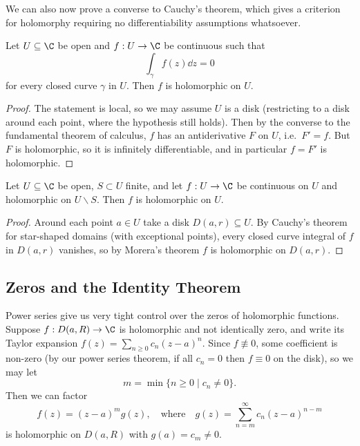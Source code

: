 We can also now prove a converse to Cauchy's theorem, which gives a criterion for holomorphy requiring no differentiability assumptions whatsoever.

\begin{theorem}
    Let $U \subseteq \C$ be open and $f: U \rightarrow \C$ be continuous such that
    $$
    \int_\gamma f(z) \dd z = 0
    $$
    for every closed curve $\gamma$ in $U$. Then $f$ is holomorphic on $U$.
\end{theorem}
\begin{proof}
    The statement is local, so we may assume $U$ is a disk (restricting to a disk around each point, where the hypothesis still holds). Then by the converse to the fundamental theorem of calculus, $f$ has an antiderivative $F$ on $U$, i.e.\ $F' = f$. But $F$ is holomorphic, so it is infinitely differentiable, and in particular $f = F'$ is holomorphic.
\end{proof}

\begin{corollary}
    Let $U \subseteq \C$ be open, $S \subset U$ finite, and let $f: U \rightarrow \C$ be continuous on $U$ and holomorphic on $U \backslash S$. Then $f$ is holomorphic on $U$.
\end{corollary}
\begin{proof}
    Around each point $a \in U$ take a disk $D(a, r) \subseteq U$. By Cauchy's theorem for star-shaped domains (with exceptional points), every closed curve integral of $f$ in $D(a, r)$ vanishes, so by Morera's theorem $f$ is holomorphic on $D(a, r)$.
\end{proof}

\subsection{Zeros and the Identity Theorem}

Power series give us very tight control over the zeros of holomorphic functions. Suppose $f: D(a, R) \rightarrow \C$ is holomorphic and not identically zero, and write its Taylor expansion $f(z) = \sum_{n \geq 0} c_n (z - a)^n$. Since $f \not\equiv 0$, some coefficient is non-zero (by our power series theorem, if all $c_n = 0$ then $f \equiv 0$ on the disk), so we may let
$$
m = \min\{n \geq 0 \mid c_n \neq 0\}.
$$
Then we can factor
$$
f(z) = (z - a)^m g(z), \quad \text{where} \quad g(z) = \sum_{n = m}^{\infty} c_n (z - a)^{n - m}
$$
is holomorphic on $D(a, R)$ with $g(a) = c_m \neq 0$.

